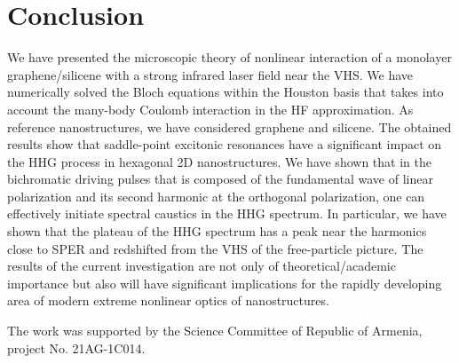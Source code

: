 \documentclass[reprint, superscriptaddress,  aps, pra]{revtex4-2}
\begin{document}
\section{Conclusion}

We have presented the microscopic theory of nonlinear interaction of a
monolayer graphene/silicene with a strong infrared laser field near the VHS.
We have numerically solved the Bloch equations within the Houston basis that
takes into account the many-body Coulomb interaction in the HF
approximation. As reference nanostructures, we have considered graphene and
silicene. The obtained results show that saddle-point excitonic resonances
have a significant impact on the HHG process in hexagonal 2D nanostructures.
We have shown that in the bichromatic driving pulses that is composed of the
fundamental wave of linear polarization and its second harmonic at the
orthogonal polarization, one can effectively initiate spectral caustics in
the HHG spectrum. In particular, we have shown that the plateau of the HHG
spectrum has a peak near the harmonics close to SPER and redshifted from the
VHS of the free-particle picture. The results of the current investigation
are not only of theoretical/academic importance but also will have
significant implications for the rapidly developing area of modern extreme
nonlinear optics of nanostructures.

\begin{acknowledgments}
The work was supported by the Science Committee of Republic of
Armenia, project No. 21AG-1C014.
\end{acknowledgments}
\end{document}
